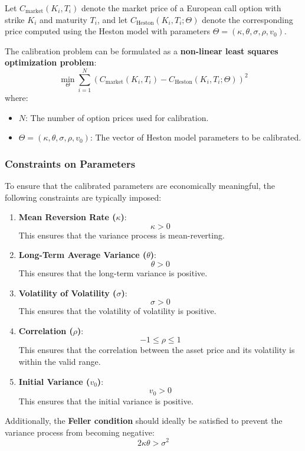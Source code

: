 \documentclass[11pt, oneside, a4paper, titlepage]{report}
\begin{document}
Let \( C_{\text{market}}(K_i, T_i) \) denote the market price of a European call option with strike \( K_i \) and maturity \( T_i \), and let \( C_{\text{Heston}}(K_i, T_i; \Theta) \) denote the corresponding price computed using the Heston model with parameters \( \Theta = (\kappa, \theta, \sigma, \rho, v_0) \).

The calibration problem can be formulated as a \textbf{non-linear least squares optimization problem}:
\[
\min_{\Theta} \sum_{i=1}^N \left( C_{\text{market}}(K_i, T_i) - C_{\text{Heston}}(K_i, T_i; \Theta) \right)^2
\]
where:
\begin{itemize}
    \item \( N \): The number of option prices used for calibration.
    \item \( \Theta = (\kappa, \theta, \sigma, \rho, v_0) \): The vector of Heston model parameters to be calibrated.
\end{itemize}

\subsubsection{Constraints on Parameters}

To ensure that the calibrated parameters are economically meaningful, the following constraints are typically imposed:
\begin{enumerate}
    \item \textbf{Mean Reversion Rate (\( \kappa \))}:
    \[
    \kappa > 0
    \]
    This ensures that the variance process is mean-reverting.
    \item \textbf{Long-Term Average Variance (\( \theta \))}:
    \[
    \theta > 0
    \]
    This ensures that the long-term variance is positive.
    \item \textbf{Volatility of Volatility (\( \sigma \))}:
    \[
    \sigma > 0
    \]
    This ensures that the volatility of volatility is positive.
    \item \textbf{Correlation (\( \rho \))}:
    \[
    -1 \leq \rho \leq 1
    \]
    This ensures that the correlation between the asset price and its volatility is within the valid range.
    \item \textbf{Initial Variance (\( v_0 \))}:
    \[
    v_0 > 0
    \]
    This ensures that the initial variance is positive.
\end{enumerate}

Additionally, the \textbf{Feller condition} should ideally be satisfied to prevent the variance process from becoming negative:
\[
2 \kappa \theta > \sigma^2
\]
\end{document}
